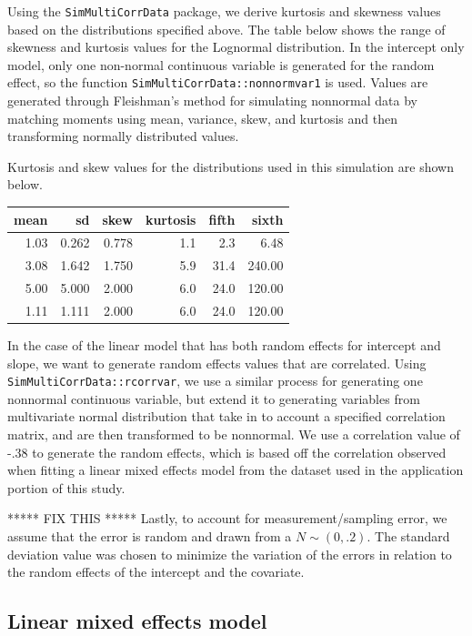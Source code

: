 \documentclass[12pt, twoside]{amherstthesis}
\begin{document}
Using the \texttt{SimMultiCorrData} package, we derive kurtosis and skewness values based on the distributions specified above. The table below shows the range of skewness and kurtosis values for the Lognormal distribution. In the intercept only model, only one non-normal continuous variable is generated for the random effect, so the function \texttt{SimMultiCorrData::nonnormvar1} is used. Values are generated through Fleishman's method for simulating nonnormal data by matching moments using mean, variance, skew, and kurtosis and then transforming normally distributed values.

Kurtosis and skew values for the distributions used in this simulation are shown below.
\begin{tabular}{r|r|r|r|r|r}
\hline
mean & sd & skew & kurtosis & fifth & sixth\\
\hline
1.03 & 0.262 & 0.778 & 1.1 & 2.3 & 6.48\\
\hline
3.08 & 1.642 & 1.750 & 5.9 & 31.4 & 240.00\\
\hline
5.00 & 5.000 & 2.000 & 6.0 & 24.0 & 120.00\\
\hline
1.11 & 1.111 & 2.000 & 6.0 & 24.0 & 120.00\\
\hline
\end{tabular}
In the case of the linear model that has both random effects for intercept and slope, we want to generate random effects values that are correlated. Using \texttt{SimMultiCorrData::rcorrvar}, we use a similar process for generating one nonnormal continuous variable, but extend it to generating variables from multivariate normal distribution that take in to account a specified correlation matrix, and are then transformed to be nonnormal. We use a correlation value of -.38 to generate the random effects, which is based off the correlation observed when fitting a linear mixed effects model from the dataset used in the application portion of this study.

***** FIX THIS ***** Lastly, to account for measurement/sampling error, we assume that the error is random and drawn from a \(N \sim (0,.2).\) The standard deviation value was chosen to minimize the variation of the errors in relation to the random effects of the intercept and the covariate.

\hypertarget{linear-mixed-effects-model}{%
\subsection{Linear mixed effects model}\label{linear-mixed-effects-model}}
\end{document}
